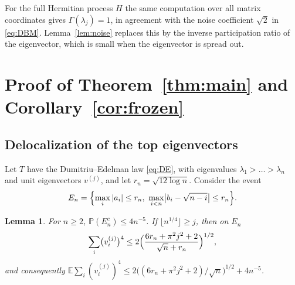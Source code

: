 \documentclass[11pt]{amsart}
\newtheorem{lemma}[theorem]{Lemma}
\theoremstyle{remark}
\newcommand{\PP}{\mathbb{P}}
\newcommand{\EE}{\mathbb{E}}
\begin{document}
For the full Hermitian process $H$ the same computation over all matrix coordinates gives $\Gamma(\lambda_j)=1$, in
agreement with the noise coefficient $\sqrt2$ in \eqref{eq:DBM}. Lemma~\ref{lem:noise} replaces this by the inverse
participation ratio of the eigenvector, which is small when the eigenvector is spread out.

\section{Proof of Theorem~\ref{thm:main} and Corollary~\ref{cor:frozen}}\label{sec:proof}
\subsection{Delocalization of the top eigenvectors}\label{sec:deloc}

Let $T$ have the Dumitriu--Edelman law \eqref{eq:DE}, with eigenvalues $\lambda_1>\dots>\lambda_n$ and unit
eigenvectors $v^{(j)}$, and let $r_n=\sqrt{12\log n}$. Consider the event
\begin{equation}\label{eq:En}
E_n=\Bigl\{\max_i|a_i|\le r_n,\ \max_{i<n}\bigl|b_i-\sqrt{n-i}\bigr|\le r_n\Bigr\}.
\end{equation}

\begin{lemma}\label{lem:deloc}
For $n\ge2$, $\PP(E_n^c)\le4n^{-5}$. If $\lfloor n^{1/4}\rfloor\ge j$, then on $E_n$
\[
\sum_i\bigl(v_i^{(j)}\bigr)^4\le2\Bigl(\frac{6r_n+\pi^2j^2+2}{\sqrt n+r_n}\Bigr)^{1/2},
\]
and consequently $\EE\sum_i(v_i^{(j)})^4\le2\bigl((6r_n+\pi^2j^2+2)/\sqrt n\bigr)^{1/2}+4n^{-5}$.
\end{lemma}
\end{document}
